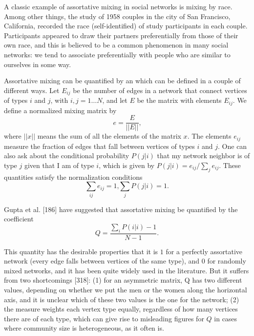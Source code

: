       A classic example of assortative mixing in social networks is mixing by race. Among other things, the study of 1958 couples in the city of San Francisco, California, recorded the race (self-identified) of study participants in each couple. Participants appeared to draw their partners preferentially from those of their own race, and this is believed to be a common phenomenon in many social networks: we tend to associate preferentially with people who are similar to ourselves in some way.

      Assortative mixing can be quantified by an  which can be defined in a couple of different ways. Let $E_{ij}$ be the number of edges in a network that connect vertices of types $i$ and $j$, with $i,j = 1 \ldots N$, and let $E$ be the matrix with elements $E_{ij}$. We define a normalized mixing matrix by
      \begin{equation}
        e = \frac{E}{||E||}\mbox{,}
      \end{equation}
      where $||x||$ means the sum of all the elements of the matrix $x$. The elements $e_{ij}$ measure the fraction of edges that fall between vertices of types $i$ and $j$. One can also ask about the conditional probability $P(j|i)$ that my network neighbor is of type $j$ given that I am of type $i$, which is given by $P (j|i) = e_{ij} / \sum_j e_{ij}$. These quantities satisfy the normalization conditions
      \begin{equation}
        \sum_{ij} e_{ij} = 1\mbox{,} \sum_j P(j|i) = 1\mbox{.}
      \end{equation}
      
      Gupta et al. [186] have suggested that assortative mixing be quantified by the coefficient
      \begin{equation}
        Q = \frac{\sum_i P(i|i) - 1}{N - 1}\mbox{.}
      \end{equation}

      This quantity has the desirable properties that it is $1$ for a perfectly assortative network (every edge falls between vertices of the same type), and $0$ for randomly mixed networks, and it has been quite widely used in the literature. But it suffers from two shortcomings [318]: (1) for an asymmetric matrix, Q has two different values, depending on whether we put the men or the women along the horizontal axis, and it is unclear which of these two values is the  one for the network; (2) the measure weights each vertex type equally, regardless of how many vertices there are of each type, which can give rise to misleading figures for $Q$ in cases where community size is heterogeneous, as it often is.
      
